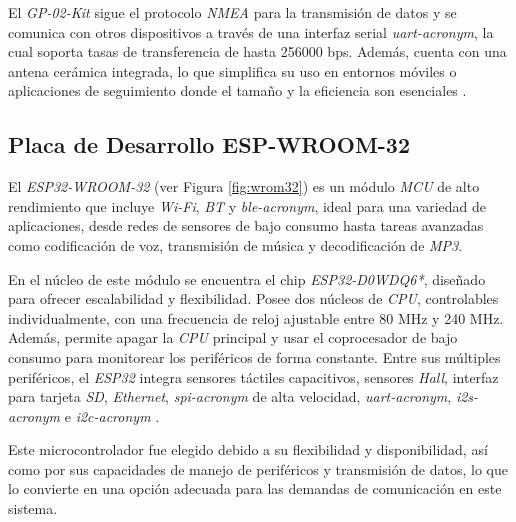 El \textit{GP-02-Kit} sigue el protocolo \textit{NMEA} para la transmisión de datos y se comunica con otros dispositivos a través de una interfaz serial \textit{\acrshort{uart-acronym}}, la cual soporta tasas de transferencia de hasta 256000 bps. Además, cuenta con una antena cerámica integrada, lo que simplifica su uso en entornos móviles o aplicaciones de seguimiento donde el tamaño y la eficiencia son esenciales \cite{GP02Kit2021}.

\subsection{Placa de Desarrollo ESP-WROOM-32}

El \textit{ESP32-WROOM-32} (ver Figura \ref{fig:wrom32}) es un módulo \textit{MCU} de alto rendimiento que incluye \textit{Wi-Fi}, \textit{BT} y \textit{\acrshort{ble-acronym}}, ideal para una variedad de aplicaciones, desde redes de sensores de bajo consumo hasta tareas avanzadas como codificación de voz, transmisión de música y decodificación de \textit{MP3}.

En el núcleo de este módulo se encuentra el chip \textit{ESP32-D0WDQ6*}, diseñado para ofrecer escalabilidad y flexibilidad. Posee dos núcleos de \textit{CPU}, controlables individualmente, con una frecuencia de reloj ajustable entre 80 MHz y 240 MHz. Además, permite apagar la \textit{CPU} principal y usar el coprocesador de bajo consumo para monitorear los periféricos de forma constante. Entre sus múltiples periféricos, el \textit{ESP32} integra sensores táctiles capacitivos, sensores \textit{Hall}, interfaz para tarjeta \textit{SD}, \textit{Ethernet}, \textit{\acrshort{spi-acronym}} de alta velocidad, \textit{\acrshort{uart-acronym}}, \textit{\acrshort{i2s-acronym}} e \textit{\acrshort{i2c-acronym}} \cite{Espressif2019}.

Este microcontrolador fue elegido debido a su flexibilidad y disponibilidad, así como por sus capacidades de manejo de periféricos y transmisión de datos, lo que lo convierte en una opción adecuada para las demandas de comunicación en este sistema.

